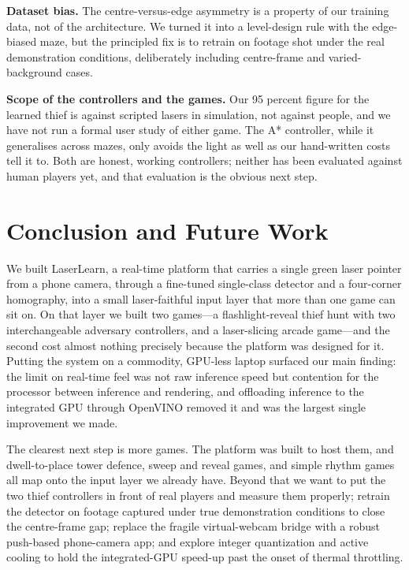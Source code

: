 \documentclass[conference]{IEEEtran}
\begin{document}
\noindent\textbf{Dataset bias.} The centre-versus-edge asymmetry is a property of
our training data, not of the architecture. We turned it into a level-design rule
with the edge-biased maze, but the principled fix is to retrain on footage shot
under the real demonstration conditions, deliberately including centre-frame and
varied-background cases.

\noindent\textbf{Scope of the controllers and the games.} Our 95 percent figure
for the learned thief is against scripted lasers in simulation, not against people,
and we have not run a formal user study of either game. The A* controller, while it
generalises across mazes, only avoids the light as well as our hand-written costs
tell it to. Both are honest, working controllers; neither has been evaluated
against human players yet, and that evaluation is the obvious next step.

\section{Conclusion and Future Work}\label{sec:conclusion}
We built LaserLearn, a real-time platform that carries a single green laser
pointer from a phone camera, through a fine-tuned single-class detector and a
four-corner homography, into a small laser-faithful input layer that more than one
game can sit on. On that layer we built two games---a flashlight-reveal thief hunt
with two interchangeable adversary controllers, and a laser-slicing arcade
game---and the second cost almost nothing precisely because the platform was
designed for it. Putting the system on a commodity, GPU-less laptop surfaced our
main finding: the limit on real-time feel was not raw inference speed but
contention for the processor between inference and rendering, and offloading
inference to the integrated GPU through OpenVINO removed it and was the largest
single improvement we made.

The clearest next step is more games. The platform was built to host them, and
dwell-to-place tower defence, sweep and reveal games, and simple rhythm games all
map onto the input layer we already have. Beyond that we want to put the two thief
controllers in front of real players and measure them properly; retrain the
detector on footage captured under true demonstration conditions to close the
centre-frame gap; replace the fragile virtual-webcam bridge with a robust
push-based phone-camera app; and explore integer quantization and active cooling to
hold the integrated-GPU speed-up past the onset of thermal throttling.
\end{document}
